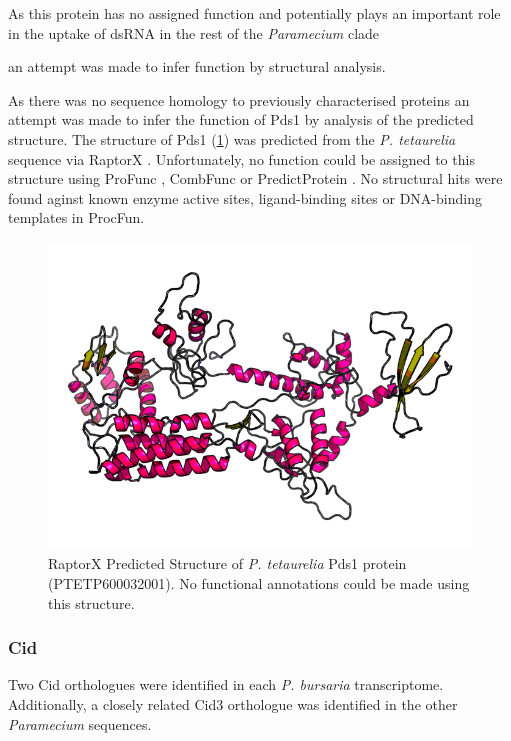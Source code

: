 As this protein has no assigned function \citep{Marker2014,Carradec2015}
and potentially plays an important role in the uptake of dsRNA in
the rest of the \textit{Paramecium} clade 




an attempt was made to infer function by structural analysis. 

As there was no sequence homology to previously characterised proteins 
an attempt was made to infer the function of Pds1 by analysis of the
predicted structure.
The structure of Pds1 (\cref{fig:pds1_struct}) was predicted 
from the \textit{P. tetaurelia}
sequence via RaptorX \citep{Kallberg2012}.  Unfortunately,
no function could be assigned to this structure using ProFunc \citep{Laskowski2005},
CombFunc \citep{Wass2012} or PredictProtein \citep{Rost2004}.
No structural hits were found aginst known enzyme active sites, ligand-binding
sites or DNA-binding templates in ProcFun.

\begin{figure}
    \centering
    \includegraphics[width=\textwidth]{psd1_struct.png}
    \caption[Predicted Structure of Pds1]{RaptorX Predicted Structure of \textit{P. tetaurelia}
    Pds1 protein (PTETP600032001). No functional annotations could be made using this structure.}
    \label{fig:pds1_struct}
\end{figure}

\subsubsection{Cid}

Two Cid orthologues were identified in each \textit{P. bursaria}
transcriptome.  Additionally, a closely related Cid3 orthologue
was identified in the other \textit{Paramecium} sequences.

